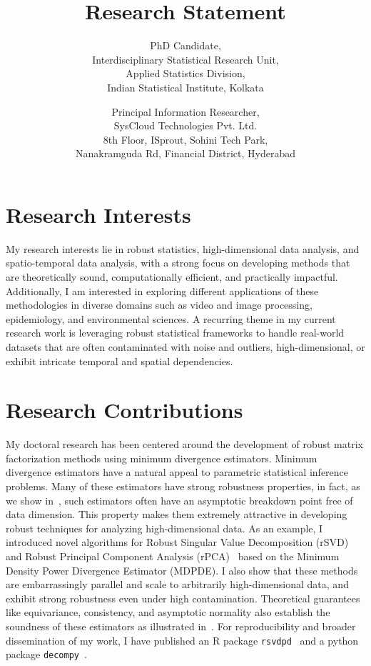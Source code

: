 \documentclass[a4paper,10pt]{article}
\title{Research Statement}
\author{PhD Candidate,\\
Interdisciplinary Statistical Research Unit,\\
Applied Statistics Division,\\
Indian Statistical Institute, Kolkata
}
\date{Principal Information Researcher,\\
SysCloud Technologies Pvt. Ltd.\\
8th Floor, ISprout, Sohini Tech Park, \\
Nanakramguda Rd, Financial District, Hyderabad
}
\begin{document}
\maketitle%

\section*{Research Interests}

My research interests lie in robust statistics, high-dimensional data analysis, and spatio-temporal data analysis, with a strong focus on developing methods that are theoretically sound, computationally efficient, and practically impactful. Additionally, I am interested in exploring different applications of these methodologies in diverse domains such as video and image processing, epidemiology, and environmental sciences. A recurring theme in my current research work is leveraging robust statistical frameworks to handle real-world datasets that are often contaminated with noise and outliers, high-dimensional, or exhibit intricate temporal and spatial dependencies.


\section*{Research Contributions}

My doctoral research has been centered around the development of robust matrix factorization methods using minimum divergence estimators. Minimum divergence estimators have a natural appeal to parametric statistical inference problems. Many of these estimators have strong robustness properties, in fact, as we show in~\cite{roy2023breakdown}, such estimators often have an asymptotic breakdown point free of data dimension. This property makes them extremely attractive in developing robust techniques for analyzing high-dimensional data. As an example, I introduced novel algorithms for Robust Singular Value Decomposition (rSVD)~\cite{roy2024rsvddpd} and Robust Principal Component Analysis (rPCA)~\cite{roy2024rpcadpd} based on the Minimum Density Power Divergence Estimator (MDPDE). I also show that these methods are embarrassingly parallel and scale to arbitrarily high-dimensional data, and exhibit strong robustness even under high contamination. Theoretical guarantees like equivariance, consistency, and asymptotic normality also establish the soundness of these estimators as illustrated in~\cite{roy2024rpcadpd}. For reproducibility and broader dissemination of my work, I have published an R package \texttt{rsvdpd}~\cite{rsvddpd-package} and a python package \texttt{decompy}~\cite{decompy-package}.
\end{document}
